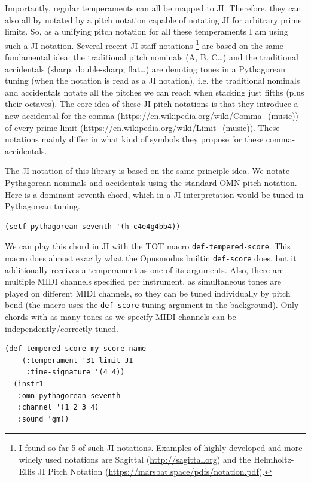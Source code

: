 \documentclass[11pt]{article}
\begin{document}
Importantly, regular temperaments can all be mapped to JI. Therefore, they can also all by
notated by a pitch notation capable of notating JI for arbitrary prime limits. So, as a unifying
pitch notation for all these temperaments I am using such a JI notation. Several recent JI staff
notations \footnote{I found so far 5 of such JI notations. Examples of highly developed and more
widely used notations are Sagittal (\url{http://sagittal.org}) and the Helmholtz-Ellis JI Pitch
Notation (\url{https://marsbat.space/pdfs/notation.pdf}).} are based on the same fundamental idea: the
traditional pitch nominals (A, B, C\ldots{}) and the traditional accidentals (sharp, double-sharp,
flat\ldots{}) are denoting tones in a Pythagorean tuning (when the notation is read as a JI
notation), i.e. the traditional nominals and accidentals notate all the pitches we can reach
when stacking just fifths (plus their octaves). The core idea of these JI pitch notations is
that they introduce a new accidental for the comma (\url{https://en.wikipedia.org/wiki/Comma\_(music)})
of every prime limit (\url{https://en.wikipedia.org/wiki/Limit\_(music)}). These notations
mainly differ in what kind of symbols they propose for these comma-accidentals.

The JI notation of this library is based on the same principle idea. We notate Pythagorean
nominals and accidentals using the standard OMN pitch notation. Here is a dominant seventh
chord, which in a JI interpretation would be tuned in Pythagorean tuning.

\begin{verbatim}
(setf pythagorean-seventh '(h c4e4g4bb4))
\end{verbatim}


We can play this chord in JI with the TOT macro \texttt{def-tempered-score}. This macro does almost
exactly what the Opusmodus builtin \texttt{def-score} does, but it additionally receives a temperament as
one of its arguments. Also, there are multiple MIDI channels specified per instrument, as
simultaneous tones are played on different MIDI channels, so they can be tuned individually by
pitch bend (the macro uses the \texttt{def-score} tuning argument in the background). Only chords with as
many tones as we specify MIDI channels can be independently/correctly tuned.

\begin{verbatim}
(def-tempered-score my-score-name
    (:temperament '31-limit-JI
     :time-signature '(4 4))
  (instr1
   :omn pythagorean-seventh
   :channel '(1 2 3 4)
   :sound 'gm))
\end{verbatim}
\end{document}
